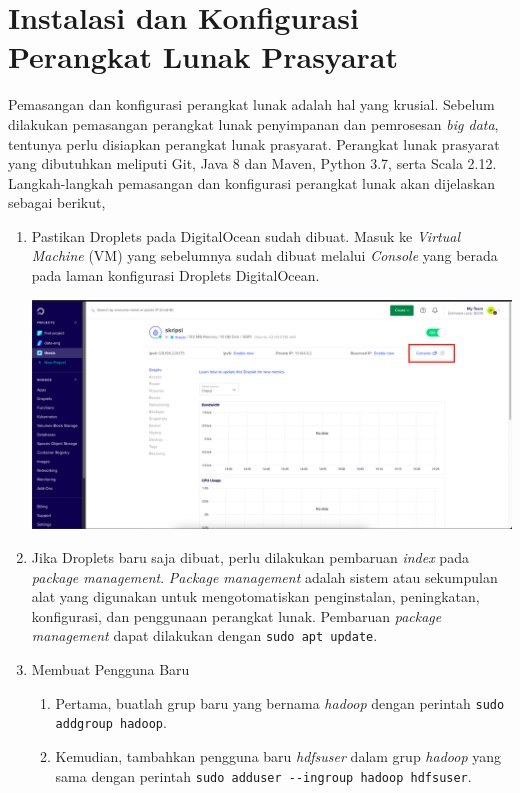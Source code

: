 \chapter{Instalasi dan Konfigurasi Perangkat Lunak Prasyarat}
\label{appendix:B}

Pemasangan dan konfigurasi perangkat lunak adalah hal yang krusial. Sebelum dilakukan pemasangan perangkat lunak penyimpanan dan pemrosesan \textit{big data}, tentunya perlu disiapkan perangkat lunak prasyarat. Perangkat lunak prasyarat yang dibutuhkan meliputi Git, Java 8 dan Maven, Python 3.7, serta Scala 2.12. Langkah-langkah pemasangan dan konfigurasi perangkat lunak akan dijelaskan sebagai berikut,

\begin{enumerate}
  \item Pastikan Droplets pada DigitalOcean sudah dibuat. Masuk ke \textit{Virtual Machine} (VM) yang sebelumnya sudah dibuat melalui \textit{Console} yang berada pada laman konfigurasi Droplets DigitalOcean.
	\begin{center}
	\includegraphics[width=1\linewidth]{figures/ch99/ap1/5.png}
	\end{center} 
  \item Jika Droplets baru saja dibuat, perlu dilakukan pembaruan \textit{index} pada \textit{package management}. \textit{Package management} adalah sistem atau sekumpulan alat yang digunakan untuk mengotomatiskan penginstalan, peningkatan, konfigurasi, dan penggunaan perangkat lunak. Pembaruan \textit{package management} dapat dilakukan dengan \verb|sudo apt update|. 
  \item Membuat Pengguna Baru   \begin{enumerate}
    \item Pertama, buatlah grup baru yang bernama \textit{hadoop} dengan perintah \verb|sudo addgroup hadoop|.
    \item Kemudian, tambahkan pengguna baru \textit{hdfsuser} dalam grup \textit{hadoop} yang sama dengan perintah \verb|sudo adduser --ingroup hadoop hdfsuser|.

\end{enumerate}
\end{enumerate}
